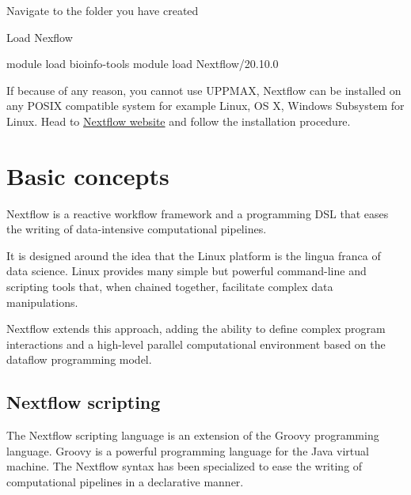 \documentclass[
]{book}
\newenvironment{Shaded}{\begin{snugshade}}{\end{snugshade}}
\newcommand{\BuiltInTok}[1]{#1}
\newcommand{\ExtensionTok}[1]{#1}
\newcommand{\NormalTok}[1]{#1}
\newcommand{\VariableTok}[1]{\textcolor[rgb]{0.00,0.00,0.00}{#1}}
\begin{document}
Navigate to the folder you have created

\begin{Shaded}
\end{Shaded}

Load Nexflow

\begin{Shaded}
\begin{Highlighting}[numbers=left,,]
\ExtensionTok{module}\NormalTok{ load bioinfo{-}tools}
\ExtensionTok{module}\NormalTok{ load Nextflow/20.10.0}
\end{Highlighting}
\end{Shaded}

If because of any reason, you cannot use UPPMAX, Nextflow can be installed on any POSIX compatible system for example Linux, OS X, Windows Subsystem for Linux. Head to \href{https://www.nextflow.io/docs/latest/getstarted.html\#installation}{Nextflow website} and follow the installation procedure.

\hypertarget{basic-concepts}{%
\chapter{Basic concepts}\label{basic-concepts}}

Nextflow is a reactive workflow framework and a programming DSL that eases the writing of data-intensive computational pipelines.

It is designed around the idea that the Linux platform is the lingua franca of data science. Linux provides many simple but powerful command-line and scripting tools that, when chained together, facilitate complex data manipulations.

Nextflow extends this approach, adding the ability to define complex program interactions and a high-level parallel computational environment based on the dataflow programming model.

\hypertarget{nextflow-scripting}{%
\section{Nextflow scripting}\label{nextflow-scripting}}

The Nextflow scripting language is an extension of the Groovy programming language. Groovy is a powerful programming language for the Java virtual machine. The Nextflow syntax has been specialized to ease the writing of computational pipelines in a declarative manner.
\end{document}
